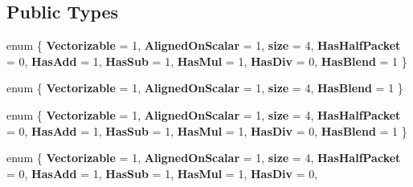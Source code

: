 \subsection*{Public Types}
\begin{DoxyCompactItemize}
\item 
\mbox{\label{struct_eigen_1_1internal_1_1packet__traits_3_01int_01_4_a1533e367718c26626f261a035379a516}} 
enum \{ \newline
{\bfseries Vectorizable} = 1, 
{\bfseries Aligned\+On\+Scalar} = 1, 
{\bfseries size} = 4, 
{\bfseries Has\+Half\+Packet} = 0, 
\newline
{\bfseries Has\+Add} = 1, 
{\bfseries Has\+Sub} = 1, 
{\bfseries Has\+Mul} = 1, 
{\bfseries Has\+Div} = 0, 
\newline
{\bfseries Has\+Blend} = 1
 \}
\item 
\mbox{\label{struct_eigen_1_1internal_1_1packet__traits_3_01int_01_4_adec16bec54bc1a59a464c2a814faf574}} 
enum \{ {\bfseries Vectorizable} = 1, 
{\bfseries Aligned\+On\+Scalar} = 1, 
{\bfseries size} = 4, 
{\bfseries Has\+Blend} = 1
 \}
\item 
\mbox{\label{struct_eigen_1_1internal_1_1packet__traits_3_01int_01_4_adf8ddc07f43c8fa3f4b664dd3780e233}} 
enum \{ \newline
{\bfseries Vectorizable} = 1, 
{\bfseries Aligned\+On\+Scalar} = 1, 
{\bfseries size} = 4, 
{\bfseries Has\+Half\+Packet} = 0, 
\newline
{\bfseries Has\+Add} = 1, 
{\bfseries Has\+Sub} = 1, 
{\bfseries Has\+Mul} = 1, 
{\bfseries Has\+Div} = 0, 
\newline
{\bfseries Has\+Blend} = 1
 \}
\item 
\mbox{\label{struct_eigen_1_1internal_1_1packet__traits_3_01int_01_4_a03025e77839c42c088bcfe3cf69f8d33}} 
enum \{ \newline
{\bfseries Vectorizable} = 1, 
{\bfseries Aligned\+On\+Scalar} = 1, 
{\bfseries size} = 4, 
{\bfseries Has\+Half\+Packet} = 0, 
\newline
{\bfseries Has\+Add} = 1, 
{\bfseries Has\+Sub} = 1, 
{\bfseries Has\+Mul} = 1, 
{\bfseries Has\+Div} = 0, 
\newline

\end{DoxyCompactItemize}
